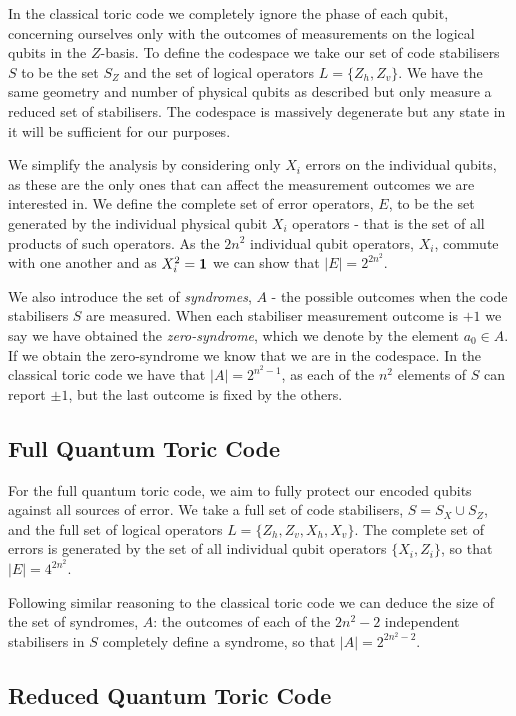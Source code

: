 In the classical toric code we completely ignore the phase of each qubit, concerning ourselves only with the outcomes of measurements on the logical qubits in the $Z$-basis. To define the codespace we take our set of code stabilisers $S$ to be the set $S_Z$ and the set of logical operators $L=\{Z_h, Z_v\}$. We have the same geometry and number of physical qubits as described but only measure a reduced set of stabilisers. The codespace is massively degenerate but any state in it will be sufficient for our purposes.

We simplify the analysis by considering only $X_i$ errors on the individual qubits, as these are the only ones that can affect the measurement outcomes we are interested in. We define the complete set of error operators, $E$, to be the set generated by the individual physical qubit $X_i$ operators - that is the set of all products of such operators. As the $2n^2$ individual qubit operators, $X_i$, commute with one another and as $X_i^2 = \mathbf{1}$ we can show that $|E| = 2^{2n^2}$.

We also introduce the set of \textit{syndromes}, $A$ - the possible outcomes when the code stabilisers $S$ are measured. When each stabiliser measurement outcome is $+1$ we say we have obtained the \textit{zero-syndrome}, which we denote by the element $a_0 \in A$. If we obtain the zero-syndrome we know that we are in the codespace. In the classical toric code we have that $|A| = 2^{n^2-1}$, as each of the $n^2$ elements of $S$ can report $\pm 1$, but the last outcome is fixed by the others.

\subsection{Full Quantum Toric Code}

For the full quantum toric code, we aim to fully protect our encoded qubits against all sources of error. We take a full set of code stabilisers, $S = S_X \cup S_Z$, and the full set of logical operators $L = \{Z_h, Z_v, X_h, X_v\}$. The complete set of errors is generated by the set of all individual qubit operators $\{X_i, Z_i\}$, so that $|E| = 4^{2n^2}$.

Following similar reasoning to the classical toric code we can deduce the size of the set of syndromes, $A$: the outcomes of each of the $2n^2 - 2$ independent stabilisers in $S$ completely define a syndrome, so that $|A| = 2^{2n^2-2}$.

\subsection{Reduced Quantum Toric Code}

